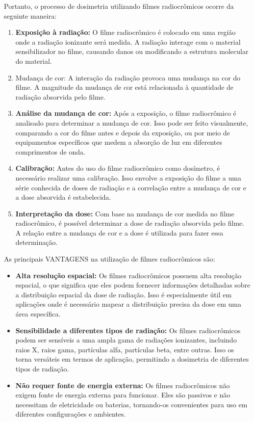 \documentclass[11pt,a4paper]{article}
\begin{document}
		Portanto, o processo de dosimetria utilizando filmes radiocrômicos ocorre da seguinte maneira:
		\begin{enumerate}
			\item \textbf{Exposição à radiação:} O filme radiocrômico é colocado em uma região onde a radiação ionizante será medida. A radiação interage com o material sensibilizador no filme, causando danos ou modificando a estrutura molecular do material.
			\item Mudança de cor: A interação da radiação provoca uma mudança na cor do filme. A magnitude da mudança de cor está relacionada à quantidade de radiação absorvida pelo filme.
			\item \textbf{Análise da mudança de cor:} Após a exposição, o filme radiocrômico é analisado para determinar a mudança de cor. Isso pode ser feito visualmente, comparando a cor do filme antes e depois da exposição, ou por meio de equipamentos específicos que medem a absorção de luz em diferentes comprimentos de onda.
			\item \textbf{Calibração:} Antes do uso do filme radiocrômico como dosímetro, é necessário realizar uma calibração. Isso envolve a exposição do filme a uma série conhecida de doses de radiação e a correlação entre a mudança de cor e a dose absorvida é estabelecida.
			\item \textbf{Interpretação da dose:} Com base na mudança de cor medida no filme radiocrômico, é possível determinar a dose de radiação absorvida pelo filme. A relação entre a mudança de cor e a dose é utilizada para fazer essa determinação.
		\end{enumerate}

		
		As principais \textcolor{CarnationPink}{VANTAGENS} na utilização de filmes radiocrômicos são:

		\begin{itemize}[label=\textcolor{CarnationPink}{$\blacktriangleright$}]
			\item \textbf{Alta resolução espacial:} Os filmes radiocrômicos possuem alta resolução espacial, o que significa que eles podem fornecer informações detalhadas sobre a distribuição espacial da dose de radiação. Isso é especialmente útil em aplicações onde é necessário mapear a distribuição precisa da dose em uma área específica.
			\item \textbf{Sensibilidade a diferentes tipos de radiação:} Os filmes radiocrômicos podem ser sensíveis a uma ampla gama de radiações ionizantes, incluindo raios X, raios gama, partículas alfa, partículas beta, entre outras. Isso os torna versáteis em termos de aplicação, permitindo a dosimetria de diferentes tipos de radiação.
			\item \textbf{Não requer fonte de energia externa:} Os filmes radiocrômicos não exigem fonte de energia externa para funcionar. Eles são passivos e não necessitam de eletricidade ou baterias, tornando-os convenientes para uso em diferentes configurações e ambientes.
		\end{itemize}
\end{document}
